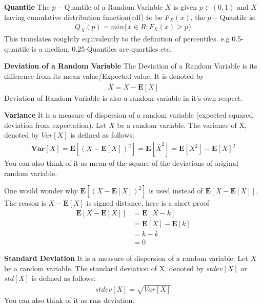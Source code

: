 \documentclass[10pt,a4paper]{article}
\begin{document}
	\begin{defn}{\textbf{Quantile}}
	The $p-$Quantile of a Random Variable $X$ is given $p \in (0,1)$
	and $X$ having cumulative distribution function(cdf) to be $F_X(x)$, the $p-$Quantile is:
	\begin{align}
	Q_X(p) = min \{ x \in R : F_X(x) \ge p \}
	\end{align}
	This translates roughtly equivalently to the definition of percentiles. e.g 0.5-quantile is a median. 0.25-Quantiles are quartiles etc.
	\end{defn}

	\begin{defn}{\textbf{Deviation of a Random Variable}}
	The Deviation of a Random Variable is its difference from its mean value/Expected value. It is denoted by 
	\begin{align}
		\overline{X} = X - \mathbf{E}[X]
	\end{align}
	Deviation of Random Variable is also a random variable in it's
	own respect.
	\end{defn}

	\begin{defn}{\textbf{Variance}}
		It is a measure of dispersion of a random variable (expected squared deviation from expectation). Let $X$ be a random variable. The variance of X, denoted by $Var[X]$ is defined as follows:\\
		\begin{align}
			\mathbf{Var}[X] = \mathbf{E}[(X - \mathbf{E}[X])^2] = \mathbf{E}[\overline{X}^2]
			 = \mathbf{E}[X^2] - \mathbf{E}[X]^2
		\end{align}
		You can also think of it as mean of the square of the deviations of original random variable.
		
		One would wonder why $\mathbf{E}[(X- \mathbf{E}[X])^2]$ is used instead of $\mathbf{E}[X - \mathbf{E}[X]]$,
		The reason is $X - \mathbf{E}[X]$ is signed distance, here is a short proof 
		\begin{align}
			\mathbf{E}[X - \mathbf{E}[X]] &= \mathbf{E}[X - k] \\
			            &= \mathbf{E}[X] - \mathbf{E}[k] \\
			            &= k - k \\
			            &= 0
		\end{align} 
	\end{defn}

	\begin{defn}{\textbf{Standard Deviation}}
	It is a measure of dispersion of a random variable. Let $X$ be a random variable. The standard deviation of X, denoted by $stdev[X]$ or $std[X]$ is defined as follows:\\
	\begin{align}
	stdev[X] = \sqrt{Var[X]}
	\end{align}
	You can also think of it as rms deviation.
	\end{defn}
\end{document}
